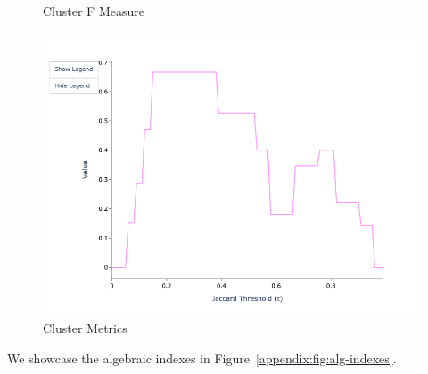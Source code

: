 \documentclass[a4paper,twoside]{article}
\begin{document}
\begin{figure}[htbp]
\begin{minipage}{0.32\textwidth}
            \caption*{Cluster F Measure}
            \includegraphics[width=\textwidth]{sample-usage/mini-alg-cf}
        \end{minipage}
        \caption{Cluster Metrics}\label{appendix:fig:alg-cluster}
    \end{figure}

    We showcase the algebraic indexes in Figure~\ref{appendix:fig:alg-indexes}.
\end{document}
